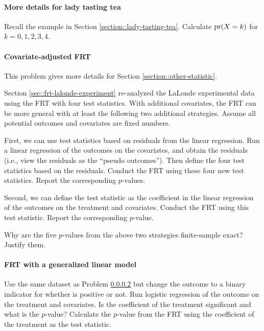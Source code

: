 \paragraph{More details for lady tasting tea}
\label{hw::more-tea}

Recall the example in Section \ref{section::lady-tasting-tea}. Calculate $\textup{pr}(X=k)$ for $k=0,1,2,3,4$. 


\paragraph{Covariate-adjusted FRT}
\label{hw::frt-covariates}


This problem gives more details for Section \ref{section::other-statistic}.  


Section \ref{sec::frt-lalonde-experiment} re-analyzed the LaLonde experimental data using the FRT with four test statistics. With additional covariates, the FRT can be more general with at least the following two additional strategies. Assume all potential outcomes and covariates are fixed numbers. 

First, we can use test statistics based on residuals from the linear regression. Run a linear regression of the outcomes on the covariates, and obtain the residuals (i.e., view the residuals as the ``pseudo outcomes''). Then define the four test statistics based on the residuals. Conduct the FRT using these four new test statistics. Report the corresponding $p$-values.


Second, we can define the test statistic as the coefficient in the linear regression of the outcomes on the treatment and covariates. Conduct the FRT using this test statistic. Report the corresponding $p$-value. 


Why are the five $p$-values from the above two strategies finite-sample exact? Justify them. 



\paragraph{FRT with a generalized linear model}
\label{hw::frt-glm}


Use the same dataset as Problem \ref{hw::frt-covariates} but change the outcome to a binary indicator for whether  is positive or not. Run logistic regression of the outcome on the treatment and covariates. Is the coefficient of the treatment significant and what is the $p$-value? Calculate the $p$-value from the FRT using the coefficient of the treatment as the test statistic. 




